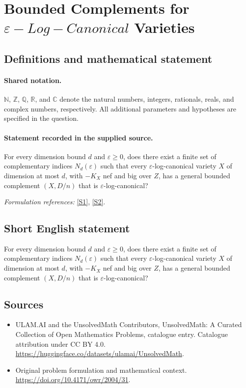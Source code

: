 \documentclass[11pt]{article}
\newcommand{\sref}[2]{\hyperlink{source:#1:#2}{[S#2]}}
\begin{document}
\section{\texorpdfstring{Bounded Complements for $\varepsilon-Log-Canonical$ Varieties}{Bounded Complements for varepsilon-Log-Canonical Varieties}}\label{statement}

\subsection{Definitions and mathematical statement}

\paragraph{Shared notation.}$\mathbb N$, $\mathbb Z$, $\mathbb Q$, $\mathbb R$, and $\mathbb C$ denote the natural numbers, integers, rationals, reals, and complex numbers, respectively. All additional parameters and hypotheses are specified in the question.


\paragraph{Statement recorded in the supplied source.}
For every dimension bound $d$ and $\varepsilon\geq 0$, does there exist a finite set of complementary indices $N_d(\varepsilon)$ such that every $\varepsilon$-log-canonical variety $X$ of dimension at most $d$, with $-K_X$ nef and big over $Z$, has a general bounded complement $(X,D/n)$ that is $\varepsilon$-log-canonical?
\par\smallskip\textit{Formulation references:} \sref{statement}{1}, \sref{statement}{2}.
\subsection{Short English statement}
For every dimension bound $d$ and $\varepsilon\geq 0$, does there exist a finite set of complementary indices $N_d(\varepsilon)$ such that every $\varepsilon$-log-canonical variety $X$ of dimension at most $d$, with $-K_X$ nef and big over $Z$, has a general bounded complement $(X,D/n)$ that is $\varepsilon$-log-canonical?
\subsection{Sources}
\begin{itemize}
\item[\hypertarget{source:statement:1}{S1}] ULAM.AI and the UnsolvedMath Contributors, UnsolvedMath: A Curated Collection of Open Mathematics Problems, catalogue entry. Catalogue attribution under CC BY 4.0.
\url{https://huggingface.co/datasets/ulamai/UnsolvedMath}.
\item[\hypertarget{source:statement:2}{S2}] Original problem formulation and mathematical context.
\url{https://doi.org/10.4171/owr/2004/31}.
\end{itemize}
\label{end:statement}
\end{document}
